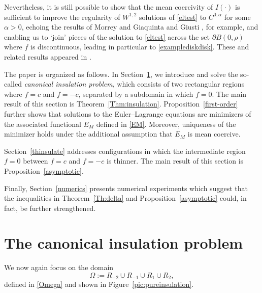 \documentclass[12pt]{amsart}
\newcommand{\om}{\Omega}
\newcommand{\1}{{\bf 1}}
\begin{document}
Nevertheless, it is still possible to show that the mean coercivity of $I(\cdot)$ is sufficient to improve the regularity of $W^{1,2}$ solutions of \eqref{eltest} to $C^{0,\alpha}$ for some $\alpha >0$, echoing the results of Morrey \cite[Theorem 4.3.1]{Mo66} and Giaquinta and Giusti \cite{GiaquintaGiusti1982}, for example, and enabling us to `join' pieces of the solution to \eqref{eltest} across the set $\partial B(0,\rho)$ where $f$ is discontinuous, leading in particular to \eqref{examplediskdisk}.  These and related results appeared in \cite{BKV25}.

The paper is organized as follows. In Section~\ref{insuproper}, we introduce and solve the so-called \emph{canonical insulation problem}, which consists of two rectangular regions where $f = c$ and $f = -c$, separated by a subdomain in which $f = 0$. The main result of this section is Theorem~\ref{Thm:insulation}. Proposition~\ref{first-order} further shows that solutions to the Euler--Lagrange equations are minimizers of the associated functional $E_M$ defined in \eqref{EM}. Moreover, uniqueness of the minimizer holds under the additional assumption that $E_M$ is mean coercive.

Section~\ref{thinsulate} addresses configurations in which the intermediate region $f = 0$ between $f = c$ and $f = -c$ is thinner. The main result of this section is Proposition~\ref{asymptotic}.

Finally, Section~\ref{numerics} presents numerical experiments which suggest that the inequalities in Theorem~\ref{Th:delta} and Proposition~\ref{asymptotic} could, in fact, be further strengthened.







\section{The canonical insulation problem}\label{insuproper}


We now again focus on the domain 
\begin{equation}\label{domain_insulation}
\Omega := R_{-2} \cup R_{-1} \cup R_1 \cup R_2,
\end{equation}
defined in \eqref{Omega} and shown in Figure~\ref{pic:pureinsulation}.
\end{document}
